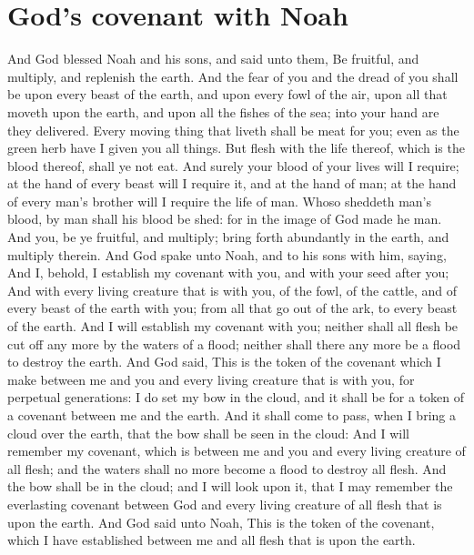 \section*{God's covenant with Noah}
\begin{biblechapter} %
\verse And God blessed Noah and his sons, and said unto them, Be fruitful, and multiply, and replenish the earth.
\verse And the fear of you and the dread of you shall be upon every beast of the earth, and upon every fowl of the air, upon all that moveth upon the earth, and upon all the fishes of the sea; into your hand are they delivered.
\verse Every moving thing that liveth shall be meat for you; even as the green herb have I given you all things.
\verse But flesh with the life thereof, which is the blood thereof, shall ye not eat.
\verse And surely your blood of your lives will I require; at the hand of every beast will I require it, and at the hand of man; at the hand of every man's brother will I require the life of man.
\verse Whoso sheddeth man's blood, by man shall his blood be shed: for in the image of God made he man.
\verse And you, be ye fruitful, and multiply; bring forth abundantly in the earth, and multiply therein.
\verse And God spake unto Noah, and to his sons with him, saying,
\verse And I, behold, I establish my covenant with you, and with your seed after you;
\verse And with every living creature that is with you, of the fowl, of the cattle, and of every beast of the earth with you; from all that go out of the ark, to every beast of the earth.
\verse And I will establish my covenant with you; neither shall all flesh be cut off any more by the waters of a flood; neither shall there any more be a flood to destroy the earth.
\verse And God said, This is the token of the covenant which I make between me and you and every living creature that is with you, for perpetual generations:
\verse I do set my bow in the cloud, and it shall be for a token of a covenant between me and the earth.
\verse And it shall come to pass, when I bring a cloud over the earth, that the bow shall be seen in the cloud:
\verse And I will remember my covenant, which is between me and you and every living creature of all flesh; and the waters shall no more become a flood to destroy all flesh.
\verse And the bow shall be in the cloud; and I will look upon it, that I may remember the everlasting covenant between God and every living creature of all flesh that is upon the earth.
\verse And God said unto Noah, This is the token of the covenant, which I have established between me and all flesh that is upon the earth.

\end{biblechapter}

